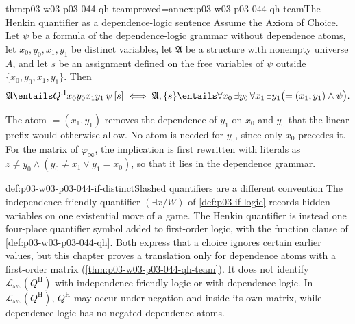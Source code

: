 \begin{hbtheorem}{thm:p03-w03-p03-044-qh-team}{proved=annex:p03-w03-p03-044-qh-team}{The Henkin quantifier as a dependence-logic sentence}
Assume the Axiom of Choice.  Let \(\psi\) be a formula of the
dependence-logic grammar without dependence atoms, let \(x_0,y_0,x_1,y_1\)
be distinct variables, let \(\mathfrak A\) be a structure with nonempty
universe \(A\), and let \(s\) be an assignment defined on the free variables
of \(\psi\) outside \(\{x_0,y_0,x_1,y_1\}\).  Then
\[
 \mathfrak A\entails Q^{\mathrm H}x_0y_0x_1y_1\,\psi\,[s]
 \iff
 \mathfrak A,\{s\}\entails
   \forall x_0\,\exists y_0\,\forall x_1\,\exists y_1
   \bigl(=(x_1,y_1)\land\psi\bigr).
\]
\end{hbtheorem}

The atom \(=(x_1,y_1)\) removes the dependence of \(y_1\) on \(x_0\) and
\(y_0\) that the linear prefix would otherwise allow.  No atom is needed for
\(y_0\), since only \(x_0\) precedes it.  For the matrix of
\(\varphi_\infty\), the implication is first rewritten with literals as
\(z\neq y_0\land(y_0\neq x_1\lor y_1=x_0)\), so that it lies in the
dependence grammar.

\begin{hbwarning}{def:p03-w03-p03-044-if-distinct}{Slashed quantifiers are a different convention}
The independence-friendly quantifier \((\exists x/W)\) of
\cref{def:p03-if-logic} records hidden variables on one existential move of
a game.  The Henkin quantifier is instead one four-place quantifier symbol
added to first-order logic, with the function clause of
\cref{def:p03-w03-p03-044-qh}.  Both express that a choice ignores certain
earlier values, but this chapter proves a translation only for dependence
atoms with a first-order matrix
(\cref{thm:p03-w03-p03-044-qh-team}).  It does not identify
\(\mathscr L_{\omega\omega}(Q^{\mathrm H})\) with independence-friendly logic
or with dependence logic.  In \(\mathscr L_{\omega\omega}(Q^{\mathrm H})\),
\(Q^{\mathrm H}\) may occur under negation and inside its own matrix, while
dependence logic has no negated dependence atoms.
\end{hbwarning}

